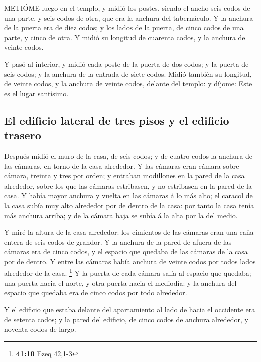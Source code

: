  METIÓME luego en el templo, y midió los postes, siendo el
ancho seis codos de una parte, y seis codos de otra, que era la anchura
del tabernáculo.  Y la anchura de la puerta era de diez
codos; y los lados de la puerta, de cinco codos de una parte, y cinco de
otra. Y midió su longitud de cuarenta codos, y la anchura de veinte
codos.

 Y pasó al interior, y midió cada poste de la puerta de dos
codos; y la puerta de seis codos; y la anchura de la entrada de siete
codos.  Midió también su longitud, de veinte codos, y la
anchura de veinte codos, delante del templo: y díjome: Este es el lugar
santísimo.

\hypertarget{el-edificio-lateral-de-tres-pisos-y-el-edificio-trasero}{%
\subsection{El edificio lateral de tres pisos y el edificio
trasero}\label{el-edificio-lateral-de-tres-pisos-y-el-edificio-trasero}}

 Después midió el muro de la casa, de seis codos; y de
cuatro codos la anchura de las cámaras, en torno de la casa alrededor.
 Y las cámaras eran cámara sobre cámara, treinta y tres por
orden; y entraban modillones en la pared de la casa alrededor, sobre los
que las cámaras estribasen, y no estribasen en la pared de la casa.
 Y había mayor anchura y vuelta en las cámaras á lo más
alto; el caracol de la casa subía muy alto alrededor por de dentro de la
casa: por tanto la casa tenía más anchura arriba; y de la cámara baja se
subía á la alta por la del medio.

 Y miré la altura de la casa alrededor: los cimientos de las
cámaras eran una caña entera de seis codos de grandor.  Y la
anchura de la pared de afuera de las cámaras era de cinco codos, y el
espacio que quedaba de las cámaras de la casa por de dentro.
 Y entre las cámaras había anchura de veinte codos por
todos lados alrededor de la casa. \footnote{\textbf{41:10} Ezeq 42,1-3}
 Y la puerta de cada cámara salía al espacio que quedaba;
una puerta hacia el norte, y otra puerta hacia el mediodía: y la anchura
del espacio que quedaba era de cinco codos por todo alrededor.

 Y el edificio que estaba delante del apartamiento al lado
de hacia el occidente era de setenta codos; y la pared del edificio, de
cinco codos de anchura alrededor, y noventa codos de largo.

